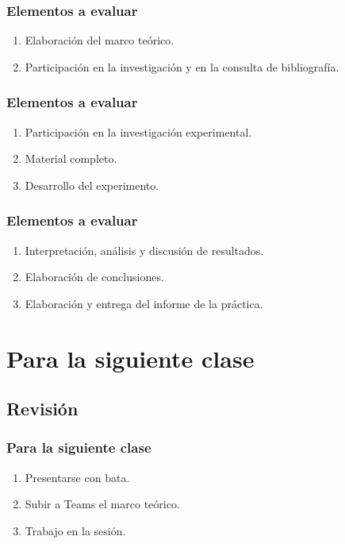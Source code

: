 \documentclass[14pt]{beamer}
\begin{document}
\begin{frame}
\frametitle{Elementos a evaluar}
\begin{enumerate}[<+->]
\item Elaboración del marco teórico.
\item Participación en la investigación y en la consulta de bibliografía.
\seti
\end{enumerate}
\end{frame}
\begin{frame}
\frametitle{Elementos a evaluar}
\begin{enumerate}[<+->]
\conti
\item Participación en la investigación experimental.
\item Material completo.
\item Desarrollo del experimento.
\seti
\end{enumerate}
\end{frame}
\begin{frame}
\frametitle{Elementos a evaluar}
\begin{enumerate}[<+->]
\conti
\item Interpretación, análisis y discusión de resultados.
\item Elaboración de conclusiones.
\item Elaboración y entrega del informe de la práctica.
\end{enumerate}
\end{frame}

\section{Para la siguiente clase}
\subsection{Revisión}

\begin{frame}
\frametitle{Para la siguiente clase}
\begin{enumerate}[<+->]
\item Presentarse con bata.
\item Subir a Teams el marco teórico.
\item Trabajo en la sesión.
\end{enumerate}
\end{frame}
\end{document}

